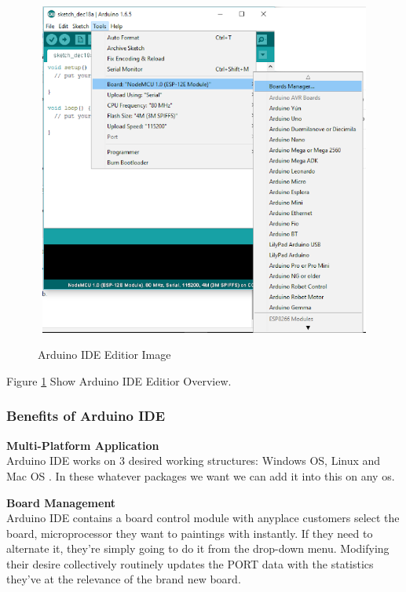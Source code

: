 \documentclass[12pt,a4paper]{article}
\begin{document}
\begin{figure}[H]
	\centering
	\includegraphics[width=14cm, height=11cm]{arduino-editor.png}\\
	\caption{Arduino IDE Editior Image }
	\label{fig:3.5}
\end{figure}
\begin{center}
Figure \ref{fig:3.5} Show Arduino IDE Editior Overview.
\end{center}

\subsubsection{Benefits of Arduino IDE}

\vspace{0.1in}
\textbf{\large{Multi-Platform Application}}\\

\hspace{0.5cm} Arduino IDE works on 3 desired working structures: Windows OS, Linux and Mac OS .
In these whatever packages we want we can add it into this on any os.

\vspace{0.1in}
\textbf{\large{Board Management}}\\

\hspace{0.5cm} Arduino IDE contains a board control module with anyplace customers select the board, microprocessor
they want to paintings with instantly. If they need to alternate it, they’re simply going to do it from the
drop-down menu. Modifying their desire collectively routinely updates the PORT data with
the statistics they've at the relevance of the brand new board.
\end{document}
